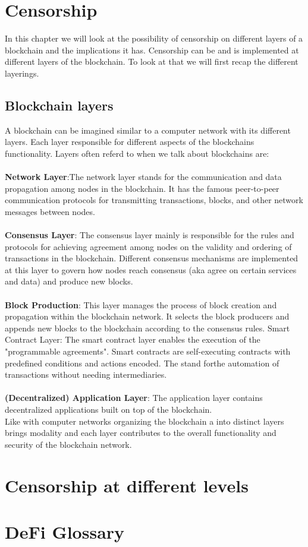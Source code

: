 \documentclass{article}
\begin{document}
\section{Censorship}

In this chapter we will look at the possibility of censorship on different layers of a blockchain and the implications it has. Censorship can be and is implemented at different layers of the blockchain. To look at that we will first recap the different layerings. 
\subsection{Blockchain layers}
A blockchain can be imagined similar to a computer network with its different layers. Each layer responsible for different aspects of the blockchains functionality. Layers often referd to when we talk about blockchains are:\\
\\
\textbf{Network Layer}:The network layer stands for the communication and data propagation among nodes in the blockchain. It has the famous peer-to-peer communication protocols for transmitting transactions, blocks, and other network messages between nodes.\\
\\
\textbf{Consensus Layer}: The consensus layer mainly is responsible for the rules and protocols for achieving agreement among nodes on the validity and ordering of transactions in the blockchain. Different consensus mechanisms are implemented at this layer to govern how nodes reach consensus (aka agree on certain services and data) and produce new blocks.\\
\\
\textbf{Block Production}: This layer manages the process of block creation and propagation within the blockchain network. It selects the block producers and appends new blocks to the blockchain according to the consensus rules.
Smart Contract Layer: The smart contract layer enables the execution of the "programmable agreements". Smart contracts are self-executing contracts with predefined conditions and actions encoded. The stand forthe automation of  transactions without needing intermediaries.\\
\\
\textbf{(Decentralized) Application Layer}: The application layer contains decentralized applications built on top of the blockchain.
\\
Like with computer networks organizing the blockchain a into distinct layers brings modality and each layer contributes to the overall functionality and security of the blockchain network.

\section{Censorship at different levels}


\section{DeFi Glossary}
\end{document}
